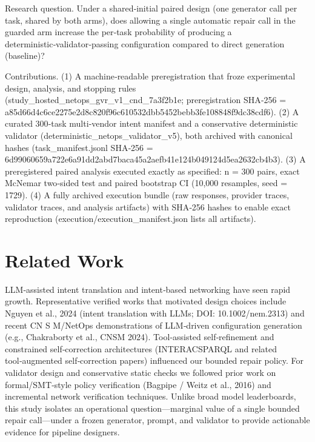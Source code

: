 \documentclass[conference]{IEEEtran}
\begin{document}
Research question. Under a shared‑initial paired design (one generator call per task, shared by both arms), does allowing a single automatic repair call in the guarded arm increase the per‑task probability of producing a deterministic‑validator‑passing configuration compared to direct generation (baseline)?

Contributions. (1) A machine‑readable preregistration that froze experimental design, analysis, and stopping rules (study\_hosted\_netops\_gvr\_v1\_cnd\_7a3f2b1e; preregistration SHA‑256 = a85d66d4c6ce2275e2d8c820f96c610532dbb5452bebb3fe108848f9dc38cdf6). (2) A curated 300‑task multi‑vendor intent manifest and a conservative deterministic validator (deterministic\_netops\_validator\_v5), both archived with canonical hashes (task\_manifest.jsonl SHA‑256 = 6d99060659a722e6a91dd2abd7baca45a2aefb41e124b049124d5ea2632cb4b3). (3) A preregistered paired analysis executed exactly as specified: n = 300 pairs, exact McNemar two‑sided test and paired bootstrap CI (10,000 resamples, seed = 1729). (4) A fully archived execution bundle (raw responses, provider traces, validator traces, and analysis artifacts) with SHA‑256 hashes to enable exact reproduction (execution/execution\_manifest.json lists all artifacts).

\section{Related Work}
LLM‑assisted intent translation and intent‑based networking have seen rapid growth. Representative verified works that motivated design choices include Nguyen et al., 2024 (intent translation with LLMs; DOI: 10.1002/nem.2313) and recent CN S M/NetOps demonstrations of LLM‑driven configuration generation (e.g., Chakraborty et al., CNSM 2024). Tool‑assisted self‑refinement and constrained self‑correction architectures (INTERACSPARQL and related tool‑augmented self‑correction papers) influenced our bounded repair policy. For validator design and conservative static checks we followed prior work on formal/SMT‑style policy verification (Bagpipe / Weitz et al., 2016) and incremental network verification techniques. Unlike broad model leaderboards, this study isolates an operational question---marginal value of a single bounded repair call---under a frozen generator, prompt, and validator to provide actionable evidence for pipeline designers.
\end{document}
